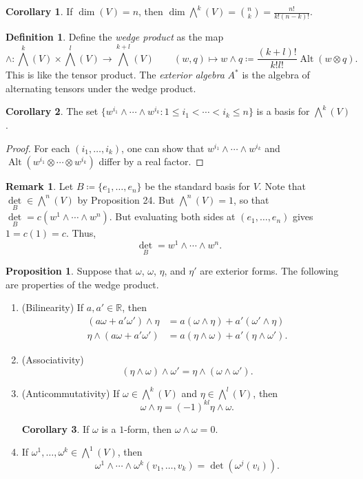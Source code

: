 \documentclass[10pt,letterpaper,cm]{nupset}
\theoremstyle{definition}
\newtheorem*{definition}{Definition}
\newtheorem{remark}{Remark}
\newtheorem{corollary}{Corollary}
\newtheorem{prop}{Proposition}
\newcommand{\R}{\mathbb R}
\newcommand{\1}{\mathbf{1}}
\newcommand{\0}{\vec 0}
\DeclareMathOperator{\Alt}{Alt}
\begin{document}
\begin{corollary}
If $\dim(V) = n$, then $\dim \bigwedge^k(V) = {n\choose k} = \frac{n!}{k!(n-k)!}$.
\end{corollary}

\begin{definition}
Define the \textit{wedge product} as the map $$\wedge : \bigwedge^k(V) \times \bigwedge^l(V) \to \bigwedge^{k+l}(V) \quad \quad (w, q) \mapsto w \wedge q \coloneqq  \frac{(k+l)!}{k! l!}\Alt(w\otimes q).$$  This is like the tensor product. The \textit{exterior algebra} $A^{\ast}$ is the algebra of alternating tensors under the wedge product.
\end{definition}

\begin{corollary}
The set $\{w^{i_1} \wedge \cdots \wedge w^{i_k}  : 1 \leq i_1 < \cdots < i_k \leq n\}$ is a basis for $\bigwedge^k(V)$.
\end{corollary}
\begin{proof}
For each $(i_1, \ldots, i_k)$, one can show that $w^{i_1} \wedge \cdots \wedge w^{i_k}$ and $\Alt(w^{i_1} \otimes \cdots \otimes w^{i_k} )$ differ by a real factor.
\end{proof}

\begin{remark}
Let $B\coloneqq  \{e_1, \ldots, e_n\}$ be the standard basis for $V$. Note that $\underset{B}{\det} \in \bigwedge^n(V)$ by Proposition 24.
But $\bigwedge^n(V) = 1$, so that $\underset{B}{\det} = c(w^1 \wedge \cdots \wedge w^n)$. But evaluating both sides at $(e_1, \ldots, e_n)$ gives $1 = c(1) = c$. Thus, $$\underset{B}{\det} = w^1 \wedge \cdots \wedge w^n.$$
\end{remark}

\begin{prop} Suppose that $\omega$, $\omega$, $\eta$, and $\eta'$ are exterior forms. The following are properties of the wedge product.
\begin{enumerate}
\item{(Bilinearity)} If $a, a' \in \R$, then 
\begin{align*}
(a\omega + a'\omega ')\wedge \eta &= a(\omega \wedge \eta) + a'(\omega' \wedge \eta)   \\   \eta \wedge (a\omega + a'\omega ') &= a(\eta \wedge \omega) + a'(\eta \wedge \omega' ). 
\end{align*}
\item{(Associativity)} $$(\eta \wedge \omega) \wedge \omega' =    \eta \wedge (\omega \wedge \omega') .$$
\item{(Anticommutativity)} If $\omega \in \bigwedge^k(V)$ and $\eta \in \bigwedge^l(V)$, then $$\omega \wedge \eta = (-1)^{kl}\eta \wedge \omega.   $$
\begin{corollary}
If $\omega$ is a $1$-form, then $\omega \wedge \omega = 0$.
\end{corollary}
\item If $\omega^1, \ldots, \omega^k \in \bigwedge^1(V)$, then $$ \omega^1 \wedge \cdots \wedge \omega^k(v_1, \ldots, v_k) =\det(\omega^j(v_i)). $$
\end{enumerate}
\end{prop}
\end{document}
